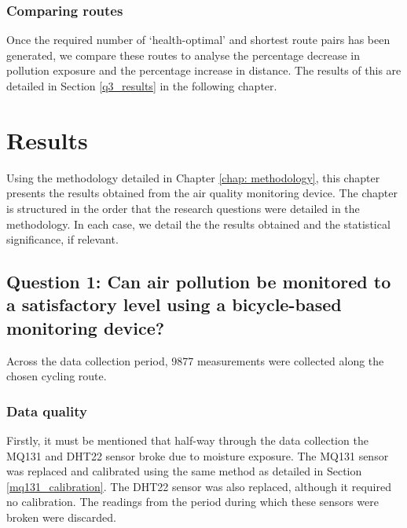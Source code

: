 \documentclass[11pt]{report}
\begin{document}
\subsection{Comparing routes}

Once the required number of `health-optimal' and shortest route pairs has been generated, we compare these routes to analyse the percentage decrease in pollution exposure and the percentage increase in distance. The results of this are detailed in Section \ref{q3_results} in the following chapter.




\chapter{Results} \label{chap: results}

Using the methodology detailed in Chapter \ref{chap: methodology}, this chapter presents the results obtained from the air quality monitoring device. The chapter is structured in the order that the research questions were detailed in the methodology. In each case, we detail the the results obtained and the statistical significance, if relevant.

\section{Question 1: Can air pollution be monitored to a satisfactory level using a bicycle-based monitoring device?} \label{q1_results}

Across the data collection period, \num{9877} measurements were collected along the chosen cycling route. 

\subsection{Data quality}

Firstly, it must be mentioned that half-way through the data collection the MQ131 and DHT22 sensor broke due to moisture exposure. The MQ131 sensor was replaced and calibrated using the same method as detailed in Section \ref{mq131_calibration}. The DHT22 sensor was also replaced, although it required no calibration. The readings from the period during which these sensors were broken were discarded.
\end{document}

